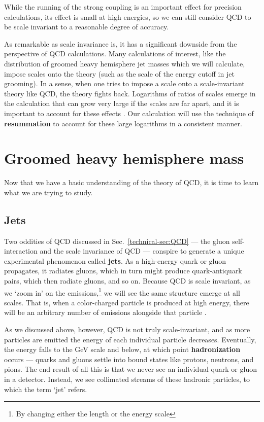 \documentclass[../thesis.tex]{subfiles}
\begin{document}
	While the running of the strong coupling is an important effect for precision calculations, its effect is small at high energies, so we can still consider QCD to be scale invariant to a reasonable degree of accuracy.

	As remarkable as scale invariance is, it has a significant downside from the perspective of QCD calculations. Many calculations of interest, like the distribution of groomed heavy hemisphere jet masses which we will calculate, impose scales onto the theory (such as the scale of the energy cutoff in jet grooming). In a sense, when one tries to impose a scale onto a scale-invariant theory like QCD, the theory fights back. Logarithms of ratios of scales emerge in the calculation that can grow very large if the scales are far apart, and it is important to account for these effects \cite{larkoski_elementary_2019-1,becher_introduction_2015-1}. Our calculation will use the technique of \textbf{resummation} to account for these large logarithms in a consistent manner.

\section{Groomed heavy hemisphere mass}
	Now that we have a basic understanding of the theory of QCD, it is time to learn what we are trying to study.

\subsection{Jets}\label{technical-sec:jets}
	Two oddities of QCD discussed in Sec.~\ref{technical-sec:QCD} --- the gluon self-interaction and the scale invariance of QCD --- conspire to generate a unique experimental phenomenon called \textbf{jets}. As a high-energy quark or gluon propagates, it radiates gluons, which in turn might produce quark-antiquark pairs, which then radiate gluons, and so on. Because QCD is scale invariant, as we `zoom in' on the emissions,\footnote{By changing either the length or the energy scale} we will see the same structure emerge at all scales. That is, when a color-charged particle is produced at high energy, there will be an arbitrary number of emissions alongside that particle \cite{larkoski_elementary_2019-1}. 

	As we discussed above, however, QCD is not truly scale-invariant, and as more particles are emitted the energy of each individual particle decreases. Eventually, the energy falls to the \si{\giga\electronvolt} scale and below, at which point \textbf{hadronization} occurs --- quarks and gluons settle into bound states like protons, neutrons, and pions. The end result of all this is that we never see an individual quark or gluon in a detector. Instead, we see collimated streams of these hadronic particles, to which the term `jet' refers.
\end{document}
